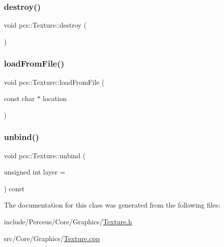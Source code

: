 \subsubsection{\texorpdfstring{destroy()}{destroy()}}
{\footnotesize\ttfamily void pcs\+::\+Texture\+::destroy (\begin{DoxyParamCaption}{ }\end{DoxyParamCaption})}

\mbox{\label{classpcs_1_1Texture_a7cedaff72d12b58ace397f7ef4de23f3}} 
\subsubsection{\texorpdfstring{load\+From\+File()}{loadFromFile()}}
{\footnotesize\ttfamily void pcs\+::\+Texture\+::load\+From\+File (\begin{DoxyParamCaption}\item[{const char $\ast$}]{location }\end{DoxyParamCaption})}

\mbox{\label{classpcs_1_1Texture_ab2a0dfd6196bd6f5608e59ca2bd9df1a}} 
\subsubsection{\texorpdfstring{unbind()}{unbind()}}
{\footnotesize\ttfamily void pcs\+::\+Texture\+::unbind (\begin{DoxyParamCaption}\item[{unsigned int}]{layer = {} }\end{DoxyParamCaption}) const}



The documentation for this class was generated from the following files\+:\begin{DoxyCompactItemize}
\item 
include/\+Perceus/\+Core/\+Graphics/\hyperlink{Texture_8h}{Texture.\+h}\item 
src/\+Core/\+Graphics/\hyperlink{Texture_8cpp}{Texture.\+cpp}\end{DoxyCompactItemize}

